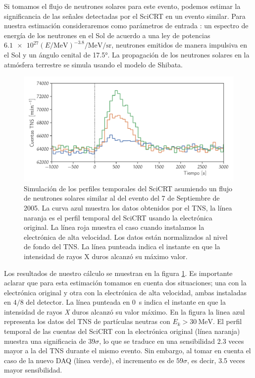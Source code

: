 Si tomamos el flujo de neutrones solares para este evento, podemos estimar la significancia de las señales detectadas por el SciCRT en un evento similar. Para nuestra estimación consideraremos como parámetros de entrada \cite{ynagai14}: un espectro de energía de los neutrones en el Sol de acuerdo a una ley de potencias
$\num{6.1e27}\left(E/\si{\mega\electronvolt}\right)^{-3.8}\si{\per\mega\electronvolt\per\steradian}$, neutrones emitidos de manera impulsiva en el Sol y un ángulo cenital de \ang{17.5}. La propagación de los neutrones solares en la atmósfera terrestre se simula usando el modelo de Shibata.

\begin{figure}
\centering
  \includegraphics[width=\textwidth]{scicrt-sim.pdf}
  \caption{Simulación de los perfiles temporales del SciCRT asumiendo un flujo de neutrones solares similar al del evento del \num{7} de Septiembre de \num{2005}. La curva azul muestra los datos obtenidos por el TNS, la línea naranja es el perfil temporal del SciCRT usando la electrónica original. La línea roja muestra el caso cuando instalamos la electrónica de alta velocidad. Los datos están normalizados al nivel de fondo del TNS. La línea punteada indica el instante en que la intensidad de rayos X duros alcanzó su máximo valor.}
  \label{fig:solar-sim}
\end{figure}

Los resultados de nuestro cálculo se muestran en la figura \ref{fig:solar-sim}. Es importante aclarar que para esta estimación tomamos en cuenta dos situaciones; una con la electrónica original y otra con la electrónica de alta velocidad, ambas instaladas en $4/8$ del detector. La línea punteada en \SI{0}{\second} indica el instante en que la intensidad de rayos \emph{X} duros alcanzó su valor máximo. En la figura la linea azul representa los datos del TNS de partículas neutras con $E_{k}>\SI{30}{\mega\electronvolt}$. El perfil temporal de las cuentas del SciCRT con la electrónica original (línea naranja) muestra una significacia de $39\sigma$, lo que se traduce en una sensibilidad \num{2.3} veces mayor a la del TNS durante el mismo evento. Sin embargo, al tomar en cuenta el caso de la nuevo DAQ (línea verde), el incremento es de $59\sigma$, es decir, \num{3.5} veces mayor sensibilidad.

